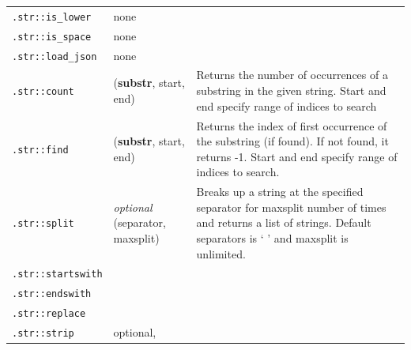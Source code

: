 {\begin{table}[t]
\begin{tabular}{l p{3cm} p{6cm}}
            \texttt{.str::is\_lower}  & none                                          &                                                                                                                        \\
            \texttt{.str::is\_space}  & none                                          &                                                                                                                        \\
            \texttt{.str::load\_json} & none                                          &                                                                                                                        \\
            \texttt{.str::count}      & (\textbf{substr}, start, end) & Returns the number of occurrences of a substring in the given string. Start and end specify range of indices to search \\
            \texttt{.str::find}       &   (\textbf{substr}, start, end)                                             &    Returns the index of first occurrence of the substring (if found). If not found, it returns -1. Start and end specify range of indices to search.                                                                                                                   \\
            \texttt{.str::split}      & \emph{optional} (separator, maxsplit)                                     &   Breaks up a string at the specified separator for maxsplit number of times and returns a list of strings. Default separators is ` ' and maxsplit is unlimited.                                                                                                                   \\
            \texttt{.str::startswith} &                                               &                                                                                                                        \\
            \texttt{.str::endswith}   &                                               &                                                                                                                        \\
            \texttt{.str::replace}    &                                               &                                                                                                                        \\
            \texttt{.str::strip}      & optional,                                     &                                                                                                                        \\

\end{tabular}
\end{table}}
